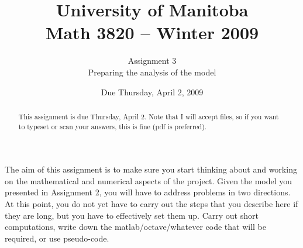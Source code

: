 \documentclass[12pt]{article}
\title{University of Manitoba\\ Math 3820 -- Winter 2009}
\author{Assignment 3\\ Preparing the analysis of the model}
\date{Due Thursday, April 2, 2009}
\theoremstyle{plain}
\begin{document}
\maketitle
\begin{abstract}
This assignment is due Thursday, April 2. Note that I will accept files, so if
you want to typeset or scan your answers, this is fine (pdf is preferred).
\end{abstract}
The aim of this assignment is to make sure you start thinking about and working on the mathematical and numerical aspects of the project. Given the model you presented in Assignment 2, you will have to address problems in two directions. At this point, you do not yet have to carry out the steps that you describe here if they are long, but you have to effectively set them up. Carry out short computations, write down the matlab/octave/whatever code that will be required, or use pseudo-code.
\end{document}
